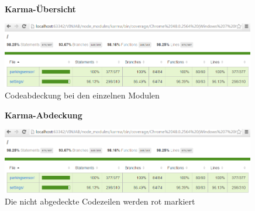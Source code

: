 \documentclass[qualitaetssicherung.tex]{subfiles}
\begin{document}
\begin{itemize}
	\begin{figure}
    \textbf{Karma-Übersicht}\par\medskip
    \includegraphics[width=0.99\textwidth]{Images/karma-example-1.png}
    \caption{Codeabdeckung bei den einzelnen Modulen}
	\end{figure}
	
	\begin{figure}
    \textbf{Karma-Abdeckung}\par\medskip
    \includegraphics[width=0.99\textwidth]{Images/karma-example-1.png}
    \caption{Die nicht abgedeckte Codezeilen werden rot markiert}
	\end{figure}
	
\end{itemize}
		
\end{document}
